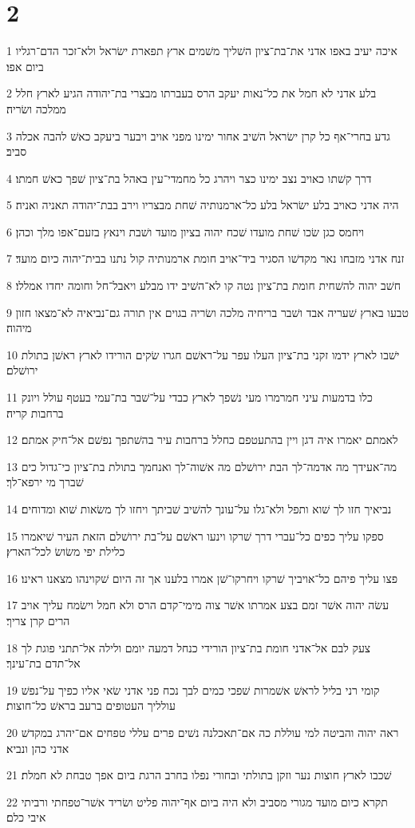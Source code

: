 \chapter{2}

\par 1 איכה יעיב באפו אדני את־בת־ציון השׁליך משׁמים ארץ תפארת ישׂראל ולא־זכר הדם־רגליו ביום אפו׃
\par 2 בלע אדני לא חמל את כל־נאות יעקב הרס בעברתו מבצרי בת־יהודה הגיע לארץ חלל ממלכה ושׂריה׃
\par 3 גדע בחרי־אף כל קרן ישׂראל השׁיב אחור ימינו מפני אויב ויבער ביעקב כאשׁ להבה אכלה סביב׃
\par 4 דרך קשׁתו כאויב נצב ימינו כצר ויהרג כל מחמדי־עין באהל בת־ציון שׁפך כאשׁ חמתו׃
\par 5 היה אדני כאויב בלע ישׂראל בלע כל־ארמנותיה שׁחת מבצריו וירב בבת־יהודה תאניה ואניה׃
\par 6 ויחמס כגן שׂכו שׁחת מועדו שׁכח יהוה בציון מועד ושׁבת וינאץ בזעם־אפו מלך וכהן׃
\par 7 זנח אדני מזבחו נאר מקדשׁו הסגיר ביד־אויב חומת ארמנותיה קול נתנו בבית־יהוה כיום מועד׃
\par 8 חשׁב יהוה להשׁחית חומת בת־ציון נטה קו לא־השׁיב ידו מבלע ויאבל־חל וחומה יחדו אמללו׃
\par 9 טבעו בארץ שׁעריה אבד ושׁבר בריחיה מלכה ושׂריה בגוים אין תורה גם־נביאיה לא־מצאו חזון מיהוה׃
\par 10 ישׁבו לארץ ידמו זקני בת־ציון העלו עפר על־ראשׁם חגרו שׂקים הורידו לארץ ראשׁן בתולת ירושׁלם׃
\par 11 כלו בדמעות עיני חמרמרו מעי נשׁפך לארץ כבדי על־שׁבר בת־עמי בעטף עולל ויונק ברחבות קריה׃
\par 12 לאמתם יאמרו איה דגן ויין בהתעטפם כחלל ברחבות עיר בהשׁתפך נפשׁם אל־חיק אמתם׃
\par 13 מה־אעידך מה אדמה־לך הבת ירושׁלם מה אשׁוה־לך ואנחמך בתולת בת־ציון כי־גדול כים שׁברך מי ירפא־לך׃
\par 14 נביאיך חזו לך שׁוא ותפל ולא־גלו על־עונך להשׁיב שׁביתך ויחזו לך משׂאות שׁוא ומדוחים׃
\par 15 ספקו עליך כפים כל־עברי דרך שׁרקו וינעו ראשׁם על־בת ירושׁלם הזאת העיר שׁיאמרו כלילת יפי משׂושׂ לכל־הארץ׃
\par 16 פצו עליך פיהם כל־אויביך שׁרקו ויחרקו־שׁן אמרו בלענו אך זה היום שׁקוינהו מצאנו ראינו׃
\par 17 עשׂה יהוה אשׁר זמם בצע אמרתו אשׁר צוה מימי־קדם הרס ולא חמל וישׂמח עליך אויב הרים קרן צריך׃
\par 18 צעק לבם אל־אדני חומת בת־ציון הורידי כנחל דמעה יומם ולילה אל־תתני פוגת לך אל־תדם בת־עינך׃
\par 19 קומי רני בליל לראשׁ אשׁמרות שׁפכי כמים לבך נכח פני אדני שׂאי אליו כפיך על־נפשׁ עולליך העטופים ברעב בראשׁ כל־חוצות׃
\par 20 ראה יהוה והביטה למי עוללת כה אם־תאכלנה נשׁים פרים עללי טפחים אם־יהרג במקדשׁ אדני כהן ונביא׃
\par 21 שׁכבו לארץ חוצות נער וזקן בתולתי ובחורי נפלו בחרב הרגת ביום אפך טבחת לא חמלת׃
\par 22 תקרא כיום מועד מגורי מסביב ולא היה ביום אף־יהוה פליט ושׂריד אשׁר־טפחתי ורביתי איבי כלם׃


